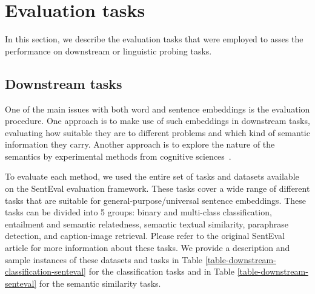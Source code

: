 \documentclass{article}
\begin{document}
\section{Evaluation tasks}
\label{sec:evaluation-tasks}
In this section, we describe the evaluation tasks that were employed to asses the performance on downstream or linguistic probing tasks.

\subsection{Downstream tasks}
One of the main issues with both word and sentence embeddings is the evaluation procedure. One approach is to make use of such embeddings in downstream tasks, evaluating how suitable they are to different problems and which kind of semantic information they carry. Another approach is to explore the nature of the semantics by experimental methods from cognitive sciences~\cite{bakarov2018survey}.

To evaluate each method, we used the entire set of tasks and datasets available on the SentEval \cite{conneau2018senteval} evaluation framework. These tasks cover a wide range of different tasks that are suitable for general-purpose/universal sentence embeddings. These tasks can be divided into 5 groups: binary and multi-class classification, entailment and semantic relatedness, semantic textual similarity, paraphrase detection, and caption-image retrieval. Please refer to the original SentEval \cite{conneau2018senteval} article for more information about these tasks. We provide a description and sample instances of these datasets and tasks in Table \ref{table-downstream-classification-senteval} for the classification tasks and in Table \ref{table-downstream-senteval} for the semantic similarity tasks.
\end{document}
